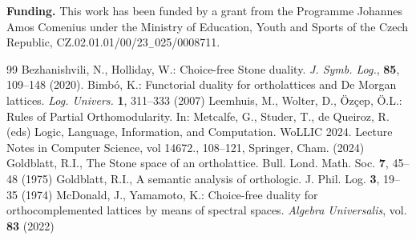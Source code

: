 \documentclass{amsart}
\theoremstyle{plain}
\theoremstyle{definition}
\begin{document}
\noindent\textbf{Funding.} This work has been funded by a grant from the Programme Johannes Amos Comenius
under the Ministry of Education, Youth and Sports of the Czech Republic,
CZ.02.01.01/00/23$_{-}$025/0008711.


\begin{thebibliography}{99}
 Bezhanishvili, N., Holliday, W.: Choice-free Stone duality. \emph{J. Symb. Log.}, \textbf{85}, 109--148 (2020). 
Bimb{\'o}, K.: Functorial duality for ortholattices and De Morgan lattices. \emph{Log. Univers.} \textbf{1}, 311--333 (2007) 
 Leemhuis, M., Wolter, D., Özçep, Ö.L.: Rules of Partial Orthomodularity. In: Metcalfe, G., Studer, T., de Queiroz, R. (eds) Logic, Language, Information, and Computation. WoLLIC 2024. Lecture Notes in Computer Science, vol 14672., 108--121, Springer, Cham. (2024)
Goldblatt, R.I., The Stone space of an ortholattice. Bull. Lond. Math. Soc. \textbf{7}, 45--48 (1975) 
Goldblatt, R.I., A semantic analysis of orthologic. J. Phil. Log. \textbf{3}, 19--35 (1974)
 McDonald, J., Yamamoto, K.: Choice-free duality for orthocomplemented lattices by means of spectral spaces. \emph{Algebra Universalis}, vol. \textbf{83} (2022)
\end{thebibliography}
\end{document}
